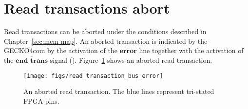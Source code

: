 \section{Read transactions abort}
Read transactions can be aborted under the conditions described in
Chapter~\ref{sec:mem map}. An aborted transaction is indicated by the {\sc
GECKO4com} by the activation of the $\overline{\textbf{error}}$ line together
with the activation of the $\overline{\textbf{end trans}}$ signal (). 
Figure~\ref{fig:read error} shows an aborted read transaction.
\begin{figure}[t]
\centering%
\texttt{[image: figs/read\_transaction\_bus\_error]}
\caption{An aborted read transaction. The blue lines represent tri-stated FPGA pins.}
\label{fig:read error}
\end{figure}
